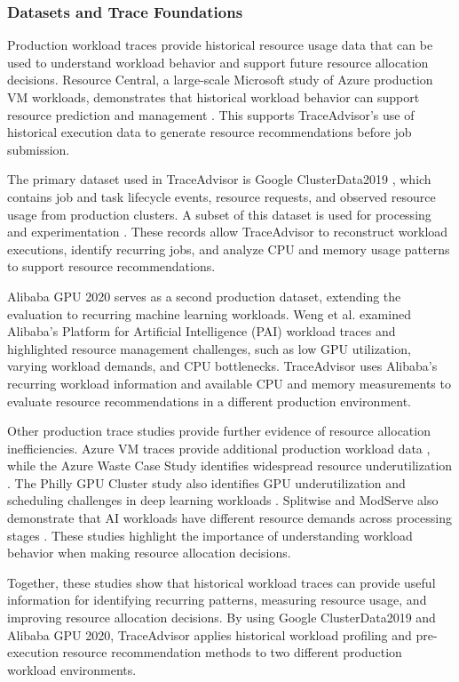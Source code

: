 \documentclass{IEEEtran}
\begin{document}
\subsubsection{Datasets and Trace Foundations}

Production workload traces provide historical resource usage data that can be used to understand workload behavior and support future resource allocation decisions. Resource Central, a large-scale Microsoft study of Azure production VM workloads, demonstrates that historical workload behavior can support resource prediction and management \cite{ref02}. This supports TraceAdvisor's use of historical execution data to generate resource recommendations before job submission.

The primary dataset used in TraceAdvisor is Google ClusterData2019 \cite{ref07}, which contains job and task lifecycle events, resource requests, and observed resource usage from production clusters. A subset of this dataset is used for processing and experimentation \cite{ref08}. These records allow TraceAdvisor to reconstruct workload executions, identify recurring jobs, and analyze CPU and memory usage patterns to support resource recommendations.

Alibaba GPU 2020 serves as a second production dataset, extending the evaluation to recurring machine learning workloads. Weng et al. \cite{ref09} examined Alibaba's Platform for Artificial Intelligence (PAI) workload traces and highlighted resource management challenges, such as low GPU utilization, varying workload demands, and CPU bottlenecks. TraceAdvisor uses Alibaba's recurring workload information and available CPU and memory measurements to evaluate resource recommendations in a different production environment.

Other production trace studies provide further evidence of resource allocation inefficiencies. Azure VM traces provide additional production workload data \cite{ref10}, while the Azure Waste Case Study identifies widespread resource underutilization \cite{ref06}. The Philly GPU Cluster study also identifies GPU underutilization and scheduling challenges in deep learning workloads \cite{ref11}. Splitwise and ModServe also demonstrate that AI workloads have different resource demands across processing stages \cite{ref12,ref13}. These studies highlight the importance of understanding workload behavior when making resource allocation decisions.

Together, these studies show that historical workload traces can provide useful information for identifying recurring patterns, measuring resource usage, and improving resource allocation decisions. By using Google ClusterData2019 and Alibaba GPU 2020, TraceAdvisor applies historical workload profiling and pre-execution resource recommendation methods to two different production workload environments.
\end{document}
